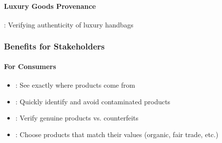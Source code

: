 \documentclass[letterpaper,10pt,english]{sphinxmanual}
\begin{document}
\paragraph{Luxury Goods Provenance}
\label{\detokenize{foundational/intro-to-supply-chain-traceability:luxury-goods-provenance}}
\sphinxAtStartPar
{}: Verifying authenticity of luxury handbags

\begin{sphinxVerbatim}[commandchars=\\\{\}]
   
              
              
              
              
             \PYG{p}{[}
                  
                  
                 
            \PYG{p}{]} 
              
\end{sphinxVerbatim}


\subsubsection{Benefits for Stakeholders}
\label{\detokenize{foundational/intro-to-supply-chain-traceability:benefits-for-stakeholders}}

\paragraph{For Consumers}
\label{\detokenize{foundational/intro-to-supply-chain-traceability:for-consumers}}\begin{itemize}
\item {} 
\sphinxAtStartPar
{}: See exactly where products come from

\item {} 
\sphinxAtStartPar
{}: Quickly identify and avoid contaminated products

\item {} 
\sphinxAtStartPar
{}: Verify genuine products vs. counterfeits

\item {} 
\sphinxAtStartPar
{}: Choose products that match their values (organic, fair trade, etc.)

\end{itemize}
\end{document}

